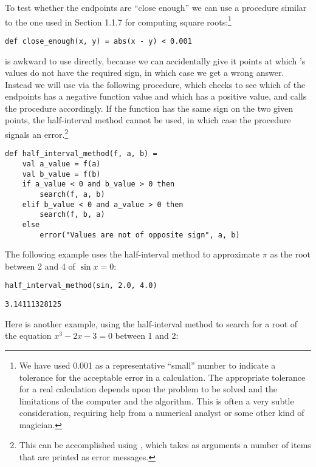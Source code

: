 To test whether the endpoints are ``close enough'' we can use a procedure similar to the one used in Section 1.1.7 for computing square roots:\footnote{We have used 0.001 as a representative ``small'' number to indicate a tolerance for the acceptable error in a calculation. The appropriate tolerance for a real calculation depends upon the problem to be solved and the limitations of the computer and the algorithm. This is often a very subtle consideration, requiring help from a numerical analyst or some other kind of magician.}

\begin{lstlisting}[style=slate]
def close_enough(x, y) = abs(x - y) < 0.001
\end{lstlisting}

 is awkward to use directly, because we can accidentally give it points at which 's values do not have the required sign, in which case we get a wrong answer. Instead we will use  via the following procedure, which checks to see which of the endpoints has a negative function value and which has a positive value, and calls the  procedure accordingly. If the function has the same sign on the two given points, the half-interval method cannot be used, in which case the procedure signals an error.\footnote{This can be accomplished using , which takes as arguments a number of items that are printed as error messages.}

\begin{lstlisting}[style=slate]
def half_interval_method(f, a, b) =
    val a_value = f(a)
    val b_value = f(b)
    if a_value < 0 and b_value > 0 then
        search(f, a, b)
    elif b_value < 0 and a_value > 0 then
        search(f, b, a)
    else
        error("Values are not of opposite sign", a, b)
\end{lstlisting}

The following example uses the half-interval method to approximate $\pi$ as the root between 2 and 4 of $\sin x = 0$:

\begin{lstlisting}[style=slate]
half_interval_method(sin, 2.0, 4.0)
\end{lstlisting}
\begin{verbatim}
3.14111328125
\end{verbatim}

Here is another example, using the half-interval method to search for a root of the equation $x^3 - 2x - 3 = 0$ between 1 and 2:

